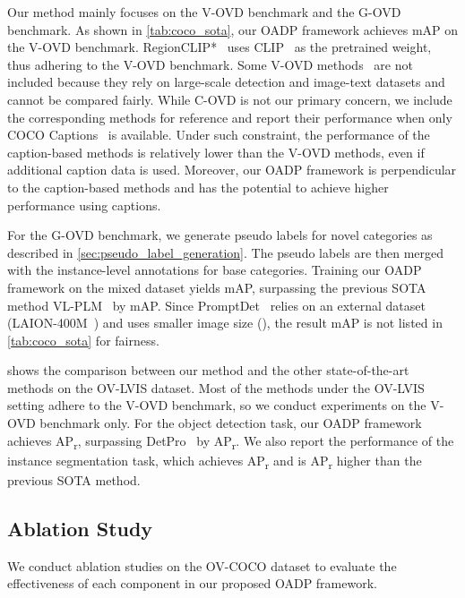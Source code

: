 \documentclass[10pt,twocolumn,letterpaper]{article}
\makeatletter
\newcommand{\@mAP}[2]{mAP}
\newcommand{\@AP}[1]{AP\textsubscript{#1}}
\newcommand{\mAPN}[1]{\@mAP{N}{#1}}
\def\APr{\@AP{r}}
\makeatother
\begin{document}
Our method mainly focuses on the V-OVD benchmark and the G-OVD benchmark.
As shown in \cref{tab:coco_sota}, our OADP framework achieves  \mAPN{50} on the V-OVD benchmark.
RegionCLIP*~\cite{regionclip} uses CLIP~\cite{clip} as the pretrained weight, thus adhering to the V-OVD benchmark.
Some V-OVD methods~\cite{glip, mdetr, x_detr, owl_vit, detclip} are not included because they rely on large-scale detection and image-text datasets and cannot be compared fairly.
While C-OVD is not our primary concern, we include the corresponding methods for reference and report their performance when only COCO Captions~\cite{coco_captions} is available.
Under such constraint, the performance of the caption-based methods is relatively lower than the V-OVD methods, even if additional caption data is used.
Moreover, our OADP framework is perpendicular to the caption-based methods and has the potential to achieve higher performance using captions.

For the G-OVD benchmark, we generate pseudo labels for novel categories as described in \cref{sec:pseudo_label_generation}.
The pseudo labels are then merged with the instance-level annotations for base categories.
Training our OADP framework on the mixed dataset yields  \mAPN{50}, surpassing the previous SOTA method VL-PLM~\cite{vl_plm} by  \mAPN{50}.
Since PromptDet~\cite{promptdet} relies on an external dataset (LAION-400M~\cite{laion_400m}) and uses smaller image size (), the result  \mAPN{50} is not listed in \cref{tab:coco_sota} for fairness.

 shows the comparison between our method and the other state-of-the-art methods on the OV-LVIS dataset.
Most of the methods under the OV-LVIS setting adhere to the V-OVD benchmark, so we conduct experiments on the V-OVD benchmark only.
For the object detection task, our OADP framework achieves  \APr, surpassing DetPro~\cite{detpro} by  \APr.
We also report the performance of the instance segmentation task, which achieves  \APr{} and is  \APr{} higher than the previous SOTA method.
 
\subsection{Ablation Study}

We conduct ablation studies on the OV-COCO dataset to evaluate the effectiveness of each component in our proposed OADP framework.
\end{document}
